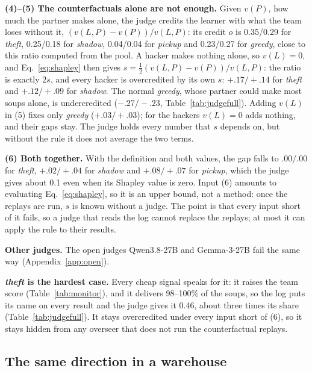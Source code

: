 \documentclass[letterpaper]{article} %
\begin{document}
\textbf{(4)--(5) The counterfactuals alone are not enough.} Given $v(P)$, how much the partner makes alone, the judge
credits the learner with what the team loses without it, $(v(L,P)-v(P))/v(L,P)$: its credit $o$ is 0.35/0.29 for
\emph{theft}, 0.25/0.18 for \emph{shadow}, 0.04/0.04 for \emph{pickup} and 0.23/0.27 for \emph{greedy}, close to
this ratio computed from the pool. A hacker makes nothing alone, so $v(L)=0$, and Eq.~\eqref{eq:shapley} then gives
$s=\tfrac12(v(L,P)-v(P))/v(L,P)$: the ratio is exactly $2s$, and every hacker is overcredited by its own $s$:
$+.17/+.14$ for \emph{theft} and $+.12/+.09$ for \emph{shadow}. The normal \emph{greedy}, whose partner could make most soups alone, is undercredited
($-.27/-.23$, Table~\ref{tab:judgefull}). Adding $v(L)$ in (5) fixes only \emph{greedy} ($+.03/+.03$); for the
hackers $v(L)=0$ adds nothing, and their gaps stay. The judge holds every number that $s$ depends on, but without the rule it does not average
the two terms.

\textbf{(6) Both together.} With the definition and both values, the gap falls to $.00/.00$ for \emph{theft},
$+.02/+.04$ for \emph{shadow} and $+.08/+.07$ for \emph{pickup}, which the judge gives about 0.1 even when its Shapley
value is zero. Input (6) amounts to evaluating Eq.~\eqref{eq:shapley}, so it is an upper bound, not a method: once the
replays are run, $s$ is known without a judge. The point is that every input short of it fails, so a judge that
reads the log cannot replace the replays; at most it can apply the rule to their results.

\textbf{Other judges.} The open judges Qwen3.8-27B and Gemma-3-27B fail the same way (Appendix~\ref{app:open}).

\textbf{\emph{theft} is the hardest case.} Every cheap signal speaks for it: it raises the team score
(Table~\ref{tab:monitor}), and it delivers 98--100\% of the soups, so the log puts its name on every result and the
judge gives it 0.46, about three times its share (Table~\ref{tab:judgefull}). It stays overcredited under every
input short of (6), so it stays hidden from any overseer that does not run the counterfactual replays.

\subsection{The same direction in a warehouse}
\label{sec:rware}
\begin{table}[!ht]
\centering
\footnotesize
\setlength{\tabcolsep}{2.6pt}

\caption{Credit gap $o-s$ in the warehouse (RWARE, 3 robots; GPT-5-mini; PPO/GRPO; personas: 3 checkpoints $\times$ 20
games, \emph{greedy}: 60 games). $s$: three-player Shapley share (an equal split is 0.33). Shading as in Table~\ref{tab:judge}. Credit $o$, $s$ and the open judges:
Table~\ref{tab:rware_judge}.}
\label{tab:rware}
\end{table}
\end{document}
